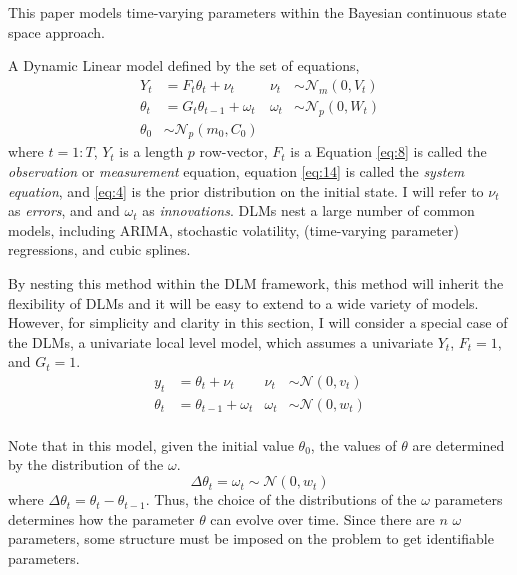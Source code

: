 \documentclass{article}
\newcommand{\paren}[1]{\ensuremath{\left(#1\right)}}
\newcommand{\dnorm}[1]{\ensuremath{\mathcal{N}\paren{#1}}}
\newcommand{\dmvnorm}[2]{\ensuremath{\mathcal{N}_{#2}\paren{#1}}}
\begin{document}
This paper models time-varying parameters within the Bayesian continuous state space approach.

A Dynamic Linear model defined by the set of equations,
\begin{align}
  \label{eq:8}
  Y_t &= F_{t} \theta_t + \nu_t & \nu_{t} &\sim \dmvnorm{0, V_{t}}{m} \\
  \label{eq:14}
  \theta_t &= G_{t} \theta_{t-1} + \omega_{t} & \omega_{t} &\sim \dmvnorm{0, W_{t}}{p} \\
  \label{eq:2}
  \theta_{0} & \sim \dmvnorm{m_{0}, C_{0}}{p}
\end{align}  
where $t = 1:T$, $Y_{t}$ is a length $p$ row-vector, $F_{t}$ is a 
Equation \eqref{eq:8} is called the \textit{observation} or \textit{measurement} equation, 
equation \eqref{eq:14} is called the \textit{system equation},
and \eqref{eq:4} is the prior distribution on the initial state.
I will refer to $\nu_{t}$ as \textit{errors}, and and $\omega_{t}$ as \textit{innovations}.
DLMs nest a large number of common models, including ARIMA, stochastic volatility, (time-varying parameter) regressions,
and cubic splines.

By nesting this method within the DLM framework, this method will inherit the flexibility of DLMs and it will be easy to extend to a wide variety of models.
However, for simplicity and clarity in this section, I will consider a special case of the DLMs, a univariate local level model, which assumes a univariate $Y_{t}$, 
$F_{t} = 1$, and $G_{t} = 1$.
\begin{align}
  \label{eq:15}
  y_t &= \theta_t + \nu_t & \nu_{t} &\sim \dnorm{0, v_{t}} \\
  \label{eq:16}
  \theta_t &= \theta_{t-1} + \omega_{t} & \omega_{t} &\sim \dnorm{0, w_{t}} \\
\end{align}

Note that in this model, given the initial value $\theta_{0}$, the values of $\theta$ are determined by the distribution of the $\omega$.
\begin{equation}
  \label{eq:12}
  \Delta \theta_{t} = \omega_{t} \sim \dnorm{0, w_{t}}
\end{equation}
where $\Delta \theta_{t} = \theta_{t} - \theta_{t - 1}$.
Thus, the choice of the distributions of the $\omega$ parameters determines how the parameter $\theta$ can evolve over time.
Since there are $n$ $\omega$ parameters, some structure must be imposed on the problem to get identifiable parameters.
\end{document}
